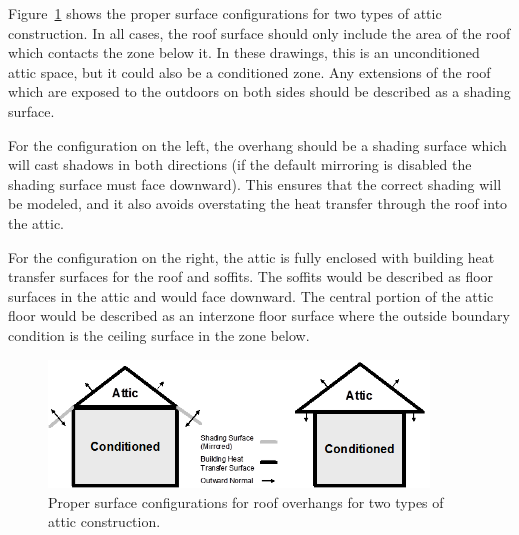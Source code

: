 Figure~\ref{fig:proper-surface-configurations-for-roof} shows the proper surface configurations for two types of attic construction. In all cases, the roof surface should only include the area of the roof which contacts the zone below it. In these drawings, this is an unconditioned attic space, but it could also be a conditioned zone. Any extensions of the roof which are exposed to the outdoors on both sides should be described as a shading surface.

For the configuration on the left, the overhang should be a shading surface which will cast shadows in both directions (if the default mirroring is disabled the shading surface must face downward). This ensures that the correct shading will be modeled, and it also avoids overstating the heat transfer through the roof into the attic.

For the configuration on the right, the attic is fully enclosed with building heat transfer surfaces for the roof and soffits. The soffits would be described as floor surfaces in the attic and would face downward. The central portion of the attic floor would be described as an interzone floor surface where the outside boundary condition is the ceiling surface in the zone below.

\begin{figure}[hbtp] %
\centering
\includegraphics[width=0.9\textwidth, height=0.9\textheight, keepaspectratio=true]{media/image005.png}
\caption{Proper surface configurations for roof overhangs for two types of attic construction. \protect \label{fig:proper-surface-configurations-for-roof}}
\end{figure}
